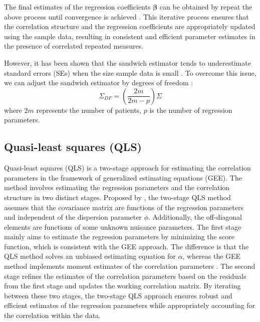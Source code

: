 \documentclass[
]{aft}
\begin{document}
The final estimates of the regression coefficients
\(\boldsymbol{\beta}\) can be obtained by repeat the above process until
convergence is achieved \citep{Liang1986}. This iterative process
ensures that the correlation structure and the regression coefficients
are appropriately updated using the sample data, resulting in consistent
and efficient parameter estimates in the presence of correlated repeated
measures.

However, it has been shown that the sandwich estimator tends to
underestimate standard errors (SEs) when the size sample data is small
\citep{Mitani2019}. To overcome this issue, we can adjust the sandwich
estimator by degrees of freedom \citep{dfcorrect}: \begin{equation}
\Sigma_{DF} = (\frac{2m}{2m-p})\Sigma \label{eq:geeSigmaDF}
\end{equation} where \(2m\) represents the number of patients, \(p\) is
the number of regression parameters.

\subsection{Quasi-least squares (QLS)}\label{quasi-least-squares-qls}

Quasi-least squares (QLS) is a two-stage approach for estimating the
correlation parameters in the framework of generalized estimating
equations (GEE). The method involves estimating the regression
parameters and the correlation structure in two distinct stages.
Proposed by \citet{qls}, the two-stage QLS method assumes that the
covariance matrix are functions of the regression parameters and
independent of the dispersion parameter \(\phi\). Additionally, the
off-diagonal elements are functions of some unknown nuisance parameters.
The first stage mainly aims to estimate the regression parameters by
minimizing the score function, which is consistent with the GEE
approach. The difference is that the QLS method solves an unbiased
estimating equation for \(\alpha\), whereas the GEE method implements
moment estimates of the correlation parameters \citep{qlspack}. The
second stage refines the estimates of the correlation parameters based
on the residuals from the first stage and updates the working
correlation matrix. By iterating between these two stages, the two-stage
QLS approach ensures robust and efficient estimates of the regression
parameters while appropriately accounting for the correlation within the
data.
\end{document}
